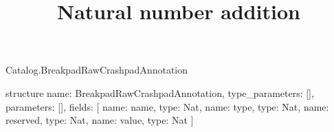 \begin{lexlean}{Catalog.BreakpadRawCrashpadAnnotation}
\title{Natural number addition}
\begin{semanticmodule}
structure{
  name: BreakpadRawCrashpadAnnotation,
  type_parameters: [],
  parameters: [],
  fields: [
    {name: name, type: Nat},
    {name: type, type: Nat},
    {name: reserved, type: Nat},
    {name: value, type: Nat}
  ]
}
\end{semanticmodule}
\end{lexlean}
